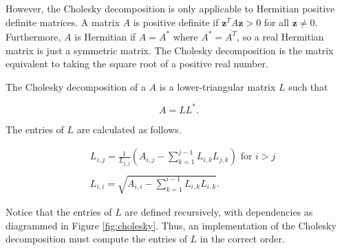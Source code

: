 However, the Cholesky decomposition is only applicable to Hermitian positive definite matrices. 
A matrix $A$ is positive definite if  $\mathbf{z}^TA\mathbf{z} > 0$ for all $\mathbf{z} \neq 0$. 
Furthermore, $A$ is Hermitian if $A = A^*$ where $A^* = \overline{A^T}$, so a real Hermitian matrix is just a symmetric matrix. 
The Cholesky decomposition is the matrix equivalent to taking the square root of a positive real number.

The Cholesky decomposition of a $A$ is a lower-triangular matrix $L$ such that

\begin{equation*}
 A = LL^*.
\end{equation*}

The entries of $L$ are calculated as follows.

\begin{align*}
&L_{i,j} = \frac{1}{L_{j,j}}\left(A_{i,j} -\sum_{k=1}^{j-1}{L_{i,k}L_{j,k}}\right) \mbox{ for $i>j$} \\ \\
&L_{i,i} = \sqrt{A_{i,i} - \sum_{k=1}^{i-1}{L_{i,k}L_{i,k}}}.
\end{align*}

Notice that the entries of $L$ are defined recursively, with dependencies as diagrammed in Figure \ref{fig:cholesky}. 
Thus, an implementation of the Cholesky decomposition must compute the entries of $L$ in the correct order.

